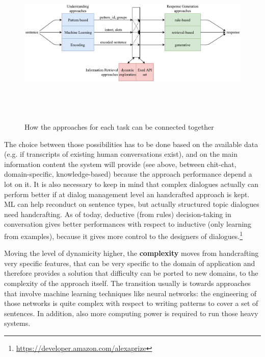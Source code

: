 \begin{figure}[!htb]
    \centering
    \includegraphics[max width=0.9\linewidth,max height=8cm,keepaspectratio]{figures/approachesCombination}
    \caption{How the approaches for each task can be connected together}\label{fig:approachesCombination}
\end{figure}

The choice between those possibilities has to be done based on the available data (e.g. if transcripts of existing human conversations exist), and on the main information content the system will provide (see above, between chit-chat, domain-specific, knowledge-based) because the approach performance depend a lot on it. It is also necessary to keep in mind that complex dialogues actually can perform better if at dialog management level an handcrafted approach is kept. ML can help reconduct on sentence types, but actually structured topic dialogues need handcrafting. As of today, deductive (from rules) decision-taking in conversation gives better performances with respect to inductive (only learning from examples), because it gives more control to the designers of dialogues.\footnote{\url{https://developer.amazon.com/alexaprize}}

Moving the level of dynamicity higher, the \textbf{complexity} moves from handcrafting very specific features, that can be very specific to the domain of application and therefore provides a solution that difficulty can be ported to new domains, to the complexity of the approach itself. The transition usually is towards approaches that involve machine learning techniques like neural networks: the engineering of those networks is quite complex with respect to writing patterns to cover a set of sentences. In addition, also more computing power is required to run those heavy systems.

